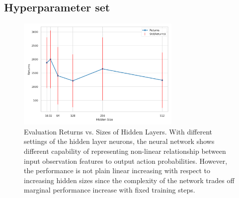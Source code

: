 \documentclass[10pt, letterpaper]{article}
\begin{document}
    \subsection{Hyperparameter set}
    \begin{figure}[htbp]
        \centering
        \includegraphics[width=0.7\textwidth]{img/q_1_3.png}
        \caption{Evaluation Returns vs. Sizes of Hidden Layers. With different settings of the hidden layer neurons, the neural network shows different capability of representing non-linear relationship between input observation features to output action probabilities. However, the performance is not plain linear increasing with respect to increasing hidden sizes since the complexity of the network trades off marginal performance increase with fixed training steps.}
        \label{fig:1}
    \end{figure}

\end{document}

